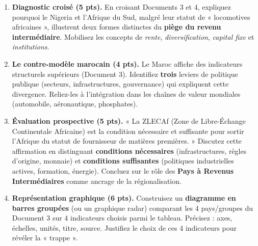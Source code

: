 \documentclass[11pt]{article}
\begin{document}
\begin{exercice}
\begin{enumerate}
\item \textbf{Diagnostic croisé (5 pts).} En croisant Documents 3 et 4, expliquez pourquoi le Nigeria et l'Afrique du Sud, malgré leur statut de « locomotives africaines », illustrent deux formes distinctes du \textbf{piège du revenu intermédiaire}. Mobilisez les concepts de \textit{rente}, \textit{diversification}, \textit{capital fixe} et \textit{institutions}.
\item \textbf{Le contre-modèle marocain (4 pts).} Le Maroc affiche des indicateurs structurels supérieurs (Document 3). Identifiez \textbf{trois} leviers de politique publique (secteurs, infrastructures, gouvernance) qui expliquent cette divergence. Reliez-les à l'intégration dans les chaînes de valeur mondiales (automobile, aéronautique, phosphates).
\item \textbf{Évaluation prospective (5 pts).} « La ZLECAf (Zone de Libre-Échange Continentale Africaine) est la condition nécessaire et suffisante pour sortir l'Afrique du statut de fournisseur de matières premières. » Discutez cette affirmation en distinguant \textbf{conditions nécessaires} (infrastructures, règles d'origine, monnaie) et \textbf{conditions suffisantes} (politiques industrielles actives, formation, énergie). Concluez sur le rôle des \textbf{Pays à Revenus Intermédiaires} comme ancrage de la régionalisation.
\item \textbf{Représentation graphique (6 pts).} Construisez un \textbf{diagramme en barres groupées} (ou un graphique radar) comparant les 4 pays/groupes du Document 3 sur 4 indicateurs choisis parmi le tableau. Précisez : axes, échelles, unités, titre, source. Justifiez le choix de ces 4 indicateurs pour révéler la « trappe ».
\end{enumerate}
\end{exercice}
\end{document}
